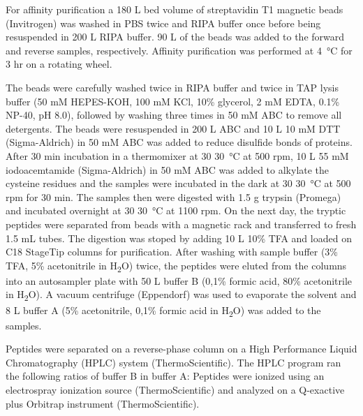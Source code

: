 For affinity purification a 180 {}\textmu L bed volume of streptavidin T1 magnetic beads (Invitrogen) was washed in PBS twice and RIPA buffer once before being resuspended in 200 {}\textmu L RIPA buffer. 90 {}\textmu L of the beads was added to the forward and reverse samples, respectively. Affinity purification was performed at \SI{4}{\celsius} for 3 hr on a rotating wheel.

The beads were carefully washed twice in RIPA buffer and twice in TAP lysis buffer (50 mM HEPES-KOH, 100 mM KCl, 10\% glycerol, 2 mM EDTA, 0.1\% NP-40, pH 8.0), followed by washing three times in 50 mM ABC to remove all detergents. The beads were resuspended in 200 {}\textmu L ABC and 10 {}\textmu L 10 mM DTT (Sigma-Aldrich) in 50 mM ABC was added to reduce disulfide bonds of proteins. After 30 min incubation in a thermomixer at 30 \SI{30}{\celsius} at 500 rpm, 10 {}\textmu L 55 mM iodoacemtamide (Sigma-Aldrich) in 50 mM ABC was added to alkylate the cysteine residues and the samples were incubated in the dark at 30 \SI{30}{\celsius} at 500 rpm for 30 min. The samples then were digested with 1.5 {}\textmu g trypsin (Promega) and incubated overnight at 30 \SI{30}{\celsius} at 1100 rpm. On the next day, the tryptic peptides were separated from beads with a magnetic rack and transferred to fresh 1.5 mL tubes. The digestion was stoped by adding 10 {}\textmu L 10\% TFA and loaded on C18 StageTip columns for purification. After washing with sample buffer (3\% TFA, 5\% acetonitrile in H\textsubscript{2}O) twice, the peptides were eluted from the columns into an autosampler plate with 50 {}\textmu L buffer B (0,1\% formic acid, 80\% acetonitrile in H\textsubscript{2}O). A vacuum centrifuge (Eppendorf) was used to evaporate the solvent and 8 {}\textmu L buffer A (5\% acetonitrile, 0,1\% formic acid in H\textsubscript{2}O) was added to the samples.

Peptides were separated on a reverse-phase column on a High Performance Liquid Chromatography (HPLC) system (ThermoScientific). The HPLC program ran the following ratios of buffer B in buffer A:
Peptides were ionized using an electrospray ionization source (ThermoScientific) and analyzed on a Q-exactive plus Orbitrap instrument (ThermoScientific).

